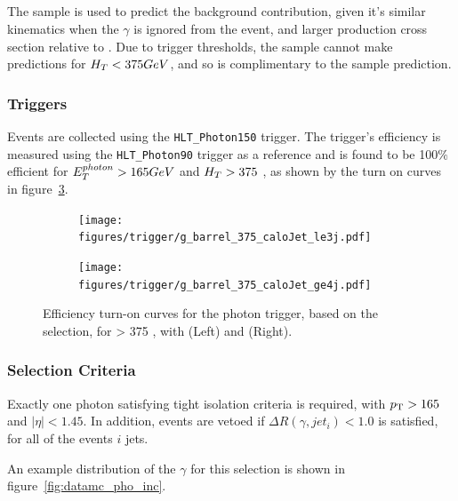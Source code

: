 \subsection{\gj}
The \gj sample is used to predict the \zinv background contribution, given it's 
similar kinematics when the $\gamma$ is ignored from the event, and larger 
production cross section relative to \mmj. Due to trigger thresholds, the \gj
sample cannot make predictions for $H_T<375GeV$, and so is complimentary to
the \mmj sample prediction.

\subsubsection{Triggers}
Events are collected using the \verb!HLT_Photon150! trigger. The trigger's 
efficiency is measured using the \verb!HLT_Photon90! trigger as a reference and
is found to be 100$\%$ efficient for $E_T^{photon}>165GeV$ and $H_T>375$ \gev, 
as shown by the turn on curves in figure~\ref{fig:photon_control_trigeff}.

\begin{figure}[ht!]
  \centering
  \begin{subfigure}[b]{0.35\textwidth}
    \texttt{[image: figures/trigger/g\_barrel\_375\_caloJet\_le3j.pdf]}
    \caption{\njlow}
    \label{fig:photon_control_trigeff_le3j}
  \end{subfigure}
  \begin{subfigure}[b]{0.35\textwidth}
    \texttt{[image: figures/trigger/g\_barrel\_375\_caloJet\_ge4j.pdf]}
    \caption{\njhigh}
    \label{fig:photon_control_trigeff_ge4j}
  \end{subfigure}
  \caption{Efficiency turn-on curves for the photon trigger, based on the \gj 
  selection, for \HT > 375 \gev, with \njlow (Left) and \njhigh(Right).}
  \label{fig:photon_control_trigeff}
\end{figure}

\subsubsection{Selection Criteria}
Exactly one photon satisfying tight isolation criteria is required, with 
${p_{\text T}} > 165$ \gev and $|\eta|<1.45$. In addition, events are vetoed if
$\Delta R(\gamma, jet_i)<1.0$ is satisfied, for all of the events $i$ jets.

An example distribution of the $\gamma$ \Pt for this selection is shown
in figure~\ref{fig:datamc_pho_inc}.


